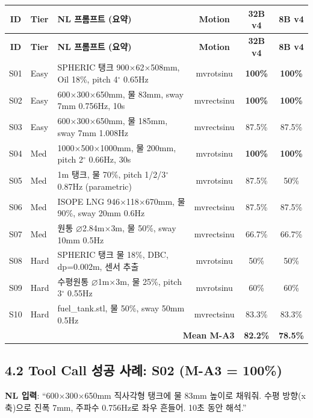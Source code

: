 \documentclass[10pt,a4paper]{article}
\begin{document}
\begin{center}
\scriptsize
\begin{longtable}{clp{4.5cm}ccc}
\toprule
\textbf{ID} & \textbf{Tier} & \textbf{NL 프롬프트 (요약)} & \textbf{Motion} & \textbf{32B v4} & \textbf{8B v4} \\
\midrule
\endfirsthead
\toprule
\textbf{ID} & \textbf{Tier} & \textbf{NL 프롬프트 (요약)} & \textbf{Motion} & \textbf{32B v4} & \textbf{8B v4} \\
\midrule
\endhead
S01 & Easy & SPHERIC 탱크 900$\times$62$\times$508mm, Oil 18\%, pitch 4$^\circ$ 0.65Hz & mvrotsinu & \textbf{100\%} & \textbf{100\%} \\
S02 & Easy & 600$\times$300$\times$650mm, 물 83mm, sway 7mm 0.756Hz, 10s & mvrectsinu & \textbf{100\%} & \textbf{100\%} \\
S03 & Easy & 600$\times$300$\times$650mm, 물 185mm, sway 7mm 1.008Hz & mvrectsinu & 87.5\% & 87.5\% \\
S04 & Med & 1000$\times$500$\times$1000mm, 물 200mm, pitch 2$^\circ$ 0.66Hz, 30s & mvrotsinu & \textbf{100\%} & \textbf{100\%} \\
S05 & Med & 1m 탱크, 물 70\%, pitch 1/2/3$^\circ$ 0.87Hz (parametric) & mvrotsinu & 87.5\% & 50\% \\
S06 & Med & ISOPE LNG 946$\times$118$\times$670mm, 물 90\%, sway 20mm 0.6Hz & mvrectsinu & 87.5\% & 87.5\% \\
S07 & Med & 원통 $\varnothing$2.84m$\times$3m, 물 50\%, sway 10mm 0.5Hz & mvrectsinu & 66.7\% & 66.7\% \\
S08 & Hard & SPHERIC 탱크 물 18\%, DBC, dp=0.002m, 센서 추출 & mvrotsinu & 50\% & 50\% \\
S09 & Hard & 수평원통 $\varnothing$1m$\times$3m, 물 25\%, pitch 3$^\circ$ 0.55Hz & mvrotsinu & 60\% & 60\% \\
S10 & Hard & fuel\_tank.stl, 물 50\%, sway 50mm 0.5Hz & mvrectsinu & 83.3\% & 83.3\% \\
\midrule
\multicolumn{4}{r}{\textbf{Mean M-A3}} & \textbf{82.2\%} & \textbf{78.5\%} \\
\bottomrule
\end{longtable}
\end{center}

\subsection{4.2 Tool Call 성공 사례: S02 (M-A3 = 100\%)}

\textbf{NL 입력}: ``600$\times$300$\times$650mm 직사각형 탱크에 물 83mm 높이로 채워줘. 수평 방향(x축)으로 진폭 7mm, 주파수 0.756Hz로 좌우 흔들어. 10초 동안 해석.''
\end{document}
